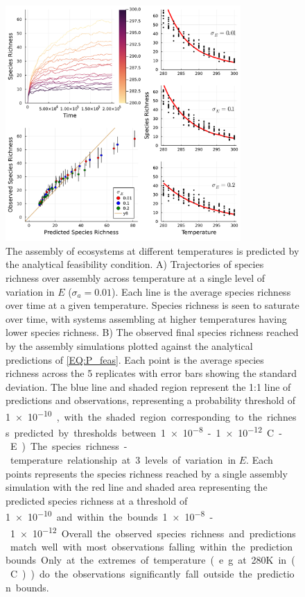 \documentclass{article}
\begin{document}
\begin{figure}
    \centering
    \includegraphics[width = 0.8\textwidth]{docs/Figures/Fig_4.pdf}
    \caption{The assembly of ecosystems at different temperatures is predicted by the analytical feasibility condition. A) Trajectories of species richness over assembly across temperature at a single level of variation in $E$ ($\sigma_a = 0.01$). Each line is the average species richness over time at a given temperature. Species richness is seen to saturate over time, with systems assembling at higher temperatures having lower species richness. B) The observed final species richness reached by the assembly simulations plotted against the analytical predictions of \cref{EQ:P_feas}. Each point is the average species richness across the 5 replicates with error bars showing the standard deviation. The blue line and shaded region represent the 1:1 line of predictions and observations, representing a probability threshold of \SI{1e-10}, with the shaded region corresponding to the richness predicted by thresholds between \SI{1e-8}-\SI{1e-12}. . C-E) The species richness - temperature relationship at 3 levels of variation in $E$. Each points represents the species richness reached by a single assembly simulation with the red line and shaded area representing the predicted species richness at a threshold of \SI{1e-10} and within the bounds \SI{1e-8}-\SI{1e-12}. Overall the observed species richness and predictions match well with most observations falling within the prediction bounds. Only at the extremes of temperature (e.g. at 280K in (C)) do the observations significantly fall outside the prediction bounds.}
    \label{Fig:Temperature_assembly}
\end{figure}
\end{document}
